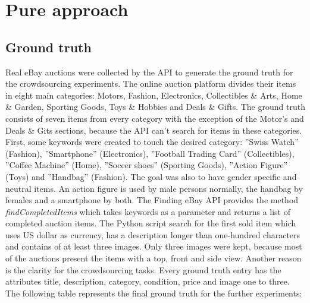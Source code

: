 \section{Pure approach}

\subsection{Ground truth}
Real eBay auctions were collected by the API to generate the ground truth for the crowdsourcing experiments. The online auction platform divides their items in eight main categories: Motors, Fashion, Electronics, Collectibles \& Arts, Home \& Garden, Sporting Goods, Toys \& Hobbies and Deals \& Gifts. The ground truth consists of seven items from every category with the exception of the Motor's and Deals \& Gits sections, because the API can't search for items in these categories. First, some keywords were created to touch the desired category: ''Swiss Watch'' (Fashion), ''Smartphone'' (Electronics), ''Football Trading Card'' (Collectibles), ''Coffee Machine'' (Home), ''Soccer shoes'' (Sporting Goods), ''Action Figure'' (Toys) and ''Handbag'' (Fashion). The goal was also to have gender specific and neutral items. An action figure is used by male persons normally, the handbag by females and a smartphone by both. The Finding eBay API provides the method \textit{findCompletedItems} which takes keywords as a parameter and returns a list of completed auction items. The Python script search for the first sold item which uses US dollar as currency, has a description longer than one-hundred characters and contains of at least three images. Only three images were kept, because most of the auctions present the items with a top, front and side view. Another reason is the clarity for the crowdsourcing tasks. Every ground truth entry has the attributes title, description, category, condition, price and image one to three. The following table represents the final ground truth for the further experiments:
